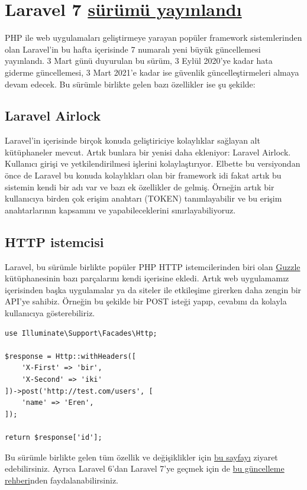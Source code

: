 \documentclass[11pt]{article}
\begin{document}
\section{Laravel 7 \href{https://laravel-news.com/laravel7}{sürümü yayınlandı}}
\label{sec:org8d6a0c0}
PHP ile web uygulamaları geliştirmeye yarayan popüler framework sistemlerinden
olan Laravel'in bu hafta içerisinde 7 numaralı yeni büyük güncellemesi
yayınlandı. 3 Mart günü duyurulan bu sürüm, 3 Eylül 2020'ye kadar hata giderme
güncellemesi, 3 Mart 2021'e kadar ise güvenlik güncelleştirmeleri almaya devam
edecek. Bu sürümle birlikte gelen bazı özellikler ise şu şekilde:

\subsection{Laravel Airlock}
\label{sec:orgf50a1ac}
Laravel'in içerisinde birçok konuda geliştiriciye kolaylıklar sağlayan alt
kütüphaneler mevcut. Artık bunlara bir yenisi daha ekleniyor: Laravel
Airlock. Kullanıcı girişi ve yetkilendirilmesi işlerini kolaylaştırıyor.
Elbette bu versiyondan önce de Laravel bu konuda kolaylıkları olan bir
framework idi fakat artık bu sistemin kendi bir adı var ve bazı ek özellikler
de gelmiş. Örneğin artık bir kullanıcıya birden çok erişim anahtarı (TOKEN)
tanımlayabilir ve bu erişim anahtarlarının kapsamını ve yapabileceklerini
sınırlayabiliyoruz.
\subsection{HTTP istemcisi}
\label{sec:orgcadc2b7}
Laravel, bu sürümle birlikte popüler PHP HTTP istemcilerinden biri olan
\href{https://github.com/guzzle/guzzle}{Guzzle} kütüphanesinin bazı parçalarını kendi içerisine ekledi. Artık web
uygulamamız içerisinden başka uygulamalar ya da siteler ile etkileşime
girerken daha zengin bir API'ye sahibiz. Örneğin bu şekilde bir POST isteği
yapıp, cevabını da kolayla kullanıcıya gösterebiliriz.
\begin{verbatim}
use Illuminate\Support\Facades\Http;

$response = Http::withHeaders([
    'X-First' => 'bir',
    'X-Second' => 'iki'
])->post('http://test.com/users', [
    'name' => 'Eren',
]);

return $response['id'];
\end{verbatim}

Bu sürümle birlikte gelen tüm özellik ve değişiklikler için \href{https://laravel.com/docs/7.x/releases}{bu sayfayı} ziyaret
edebilirsiniz. Ayrıca Laravel 6'dan Laravel 7'ye geçmek için de \href{https://laravel.com/docs/7.x/upgrade}{bu güncelleme
rehberi}nden faydalanabilirsiniz.
\end{document}
